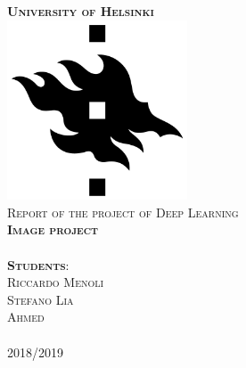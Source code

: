 \begin{titlepage}	
	\begin{center}
		
		\large{\huge \textbf{\textsc{University of Helsinki}}}
		~\\[1.0cm]
					
		\includegraphics[width=0.4\textwidth]{images/hy_logo} 
		~\\[1cm]
		
		\LARGE{\textsc{Report of the project of Deep Learning}}
		\HRuleThin		
		~\\[0.2cm]
				
		{\LARGE \textsc{\textbf{Image project}}}
		~\\[0.1cm]		

		\HRuleThin
		~\\[1.0cm]
		
		\textsc{\textbf{Students}: \\
		Riccardo Menoli \\
		Stefano Lia \\
		Ahmed \\ }
		~\\[0.2cm]
		\textsc{2018/2019}
	\end{center}

\end{titlepage}
